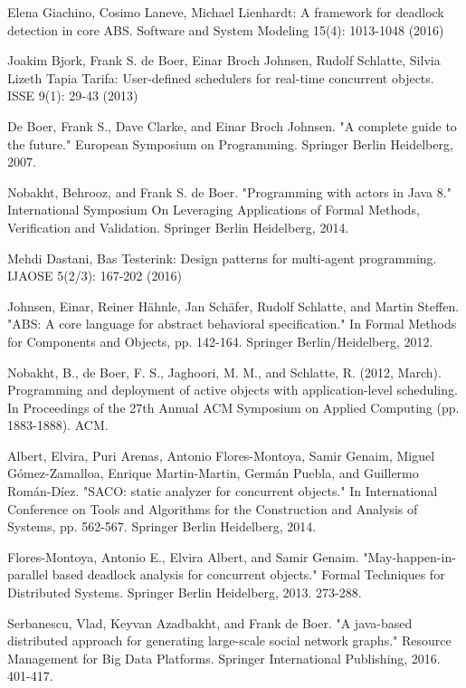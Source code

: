 \documentclass[runningheads,a4paper]{llncs}
\begin{document}
\begin{thebibliography}{4}
Elena Giachino, Cosimo Laneve, Michael Lienhardt:
A framework for deadlock detection in core ABS. Software and System Modeling 15(4): 1013-1048 (2016)


		Joakim Bjork, Frank S. de Boer, Einar Broch Johnsen, Rudolf Schlatte, Silvia Lizeth Tapia Tarifa:
		User-defined schedulers for real-time concurrent objects. ISSE 9(1): 29-43 (2013)
		
		De Boer, Frank S., Dave Clarke, and Einar Broch Johnsen. "A complete guide to the future." European Symposium on Programming. Springer Berlin Heidelberg, 2007.
		
		 Nobakht, Behrooz, and Frank S. de Boer. "Programming with actors in Java 8." International Symposium On Leveraging Applications of Formal Methods, Verification and Validation. Springer Berlin Heidelberg, 2014.
		
		 Mehdi Dastani, Bas Testerink:
		Design patterns for multi-agent programming. IJAOSE 5(2/3): 167-202 (2016)
		
		 Johnsen, Einar, Reiner Hähnle, Jan Schäfer, Rudolf Schlatte, and Martin Steffen. "ABS: A core language for abstract behavioral specification." In Formal Methods for Components and Objects, pp. 142-164. Springer Berlin/Heidelberg, 2012.
		
		 Nobakht, B., de Boer, F. S., Jaghoori, M. M., and Schlatte, R. (2012, March). Programming and deployment of active objects with application-level scheduling. In Proceedings of the 27th Annual ACM Symposium on Applied Computing (pp. 1883-1888). ACM.
		
		 Albert, Elvira, Puri Arenas, Antonio Flores-Montoya, Samir Genaim, Miguel Gómez-Zamalloa, Enrique Martin-Martin, Germán Puebla, and Guillermo Román-Díez. "SACO: static analyzer for concurrent objects." In International Conference on Tools and Algorithms for the Construction and Analysis of Systems, pp. 562-567. Springer Berlin Heidelberg, 2014.
		
		Flores-Montoya, Antonio E., Elvira Albert, and Samir Genaim. "May-happen-in-parallel based deadlock analysis for concurrent objects." Formal Techniques for Distributed Systems. Springer Berlin Heidelberg, 2013. 273-288.
		
		Serbanescu, Vlad, Keyvan Azadbakht, and Frank de Boer. "A java-based distributed approach for generating large-scale social network graphs." Resource Management for Big Data Platforms. Springer International Publishing, 2016. 401-417.
		

\end{thebibliography}
\end{document}
